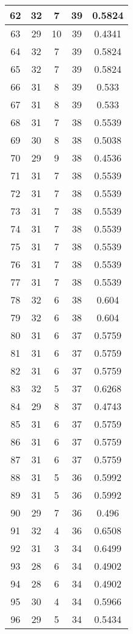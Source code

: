\documentclass[letterpaper, 12pt]{article}
\begin{document}
\begin{longtable}{|c|c|c|c|c|}
\hline
62 & 32 & 7 & 39 & 0.5824 \\
\hline
63 & 29 & 10 & 39 & 0.4341 \\
\hline
64 & 32 & 7 & 39 & 0.5824 \\
\hline
65 & 32 & 7 & 39 & 0.5824 \\
\hline
66 & 31 & 8 & 39 & 0.533 \\
\hline
67 & 31 & 8 & 39 & 0.533 \\
\hline
68 & 31 & 7 & 38 & 0.5539 \\
\hline
69 & 30 & 8 & 38 & 0.5038 \\
\hline
70 & 29 & 9 & 38 & 0.4536 \\
\hline
71 & 31 & 7 & 38 & 0.5539 \\
\hline
72 & 31 & 7 & 38 & 0.5539 \\
\hline
73 & 31 & 7 & 38 & 0.5539 \\
\hline
74 & 31 & 7 & 38 & 0.5539 \\
\hline
75 & 31 & 7 & 38 & 0.5539 \\
\hline
76 & 31 & 7 & 38 & 0.5539 \\
\hline
77 & 31 & 7 & 38 & 0.5539 \\
\hline
78 & 32 & 6 & 38 & 0.604 \\
\hline
79 & 32 & 6 & 38 & 0.604 \\
\hline
80 & 31 & 6 & 37 & 0.5759 \\
\hline
81 & 31 & 6 & 37 & 0.5759 \\
\hline
82 & 31 & 6 & 37 & 0.5759 \\
\hline
83 & 32 & 5 & 37 & 0.6268 \\
\hline
84 & 29 & 8 & 37 & 0.4743 \\
\hline
85 & 31 & 6 & 37 & 0.5759 \\
\hline
86 & 31 & 6 & 37 & 0.5759 \\
\hline
87 & 31 & 6 & 37 & 0.5759 \\
\hline
88 & 31 & 5 & 36 & 0.5992 \\
\hline
89 & 31 & 5 & 36 & 0.5992 \\
\hline
90 & 29 & 7 & 36 & 0.496 \\
\hline
91 & 32 & 4 & 36 & 0.6508 \\
\hline
92 & 31 & 3 & 34 & 0.6499 \\
\hline
93 & 28 & 6 & 34 & 0.4902 \\
\hline
94 & 28 & 6 & 34 & 0.4902 \\
\hline
95 & 30 & 4 & 34 & 0.5966 \\
\hline
96 & 29 & 5 & 34 & 0.5434 \\

\end{longtable}
\end{document}

